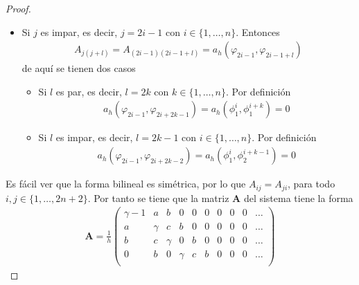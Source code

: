 \documentclass[10pt,a4paper]{report}
\begin{document}
\begin{proof}
\begin{itemize}
\begin{itemize}
\begin{itemize}
\begin{align*}
        			a_{h}(\varphi_{2i},\varphi_{2i+2k}) = a_{h}(\phi^{i}_{2},\phi^{i+k}_{2}) = 0
        		\end{align*}
        		\item Si $l$ es impar, es decir, $l = 2k-1$ con $k\in\{1,\dots,n\}$. Por definición
        		\begin{align*}
        			a_{h}(\varphi_{2i},\varphi_{2i+2k-1}) = a_{h}(\phi^{i}_{2},\phi^{i+k}_{1}) = 0
        		\end{align*}
        	\end{itemize}
        	\item Si $j$ es impar, es decir, $j = 2i-1$ con $i\in\{1,\dots,n\}$. Entonces
        	\begin{align*}
        		A_{j(j+l)} = A_{(2i-1)(2i-1+l)} = a_{h}(\varphi_{2i-1},\varphi_{2i-1+l})
        	\end{align*}
        	de aquí se tienen dos casos 
        	\begin{itemize}
        		\item Si $l$ es par, es decir, $l = 2k$ con $k\in\{1,\dots,n\}$. Por definición
        		\begin{align*}
        			a_{h}(\varphi_{2i-1},\varphi_{2i+2k-1}) = a_{h}(\phi^{i}_{1},\phi^{i+k}_{1}) = 0
        		\end{align*}
        		\item Si $l$ es impar, es decir, $l = 2k-1$ con $i\in\{1,\dots,n\}$. Por definición
        		\begin{align*}
        			a_{h}(\varphi_{2i-1},\varphi_{2i+2k-2}) = a_{h}(\phi^{i}_{1},\phi^{i+k-1}_{2}) = 0
        		\end{align*}
        	\end{itemize}
        \end{itemize}
        \end{itemize}
    Es fácil ver que la forma bilineal es simétrica, por lo que $A_{ij} = A_{ji}$, para todo $i,j\in\{1,\dots,2n+2\}$. Por tanto se tiene que la matriz $\textbf{A}$ del sistema tiene la forma
    \begin{align*}
    	\textbf{A} = \frac{1}{h}\begin{pmatrix}
    		\gamma -1 & a & b & 0 & 0 & 0 & 0 & 0 & 0 & \hdots \\ 
    		a & \gamma & c & b & 0 & 0 & 0 & 0 & 0 & \hdots\\ 
    		b & c & \gamma & 0 & b & 0 & 0 & 0 & 0 & \hdots\\ 
    		0 & b & 0 & \gamma & c & b & 0 & 0 & 0 & \hdots\\ 

\end{pmatrix}
\end{align*}
\end{proof}
\end{document}
